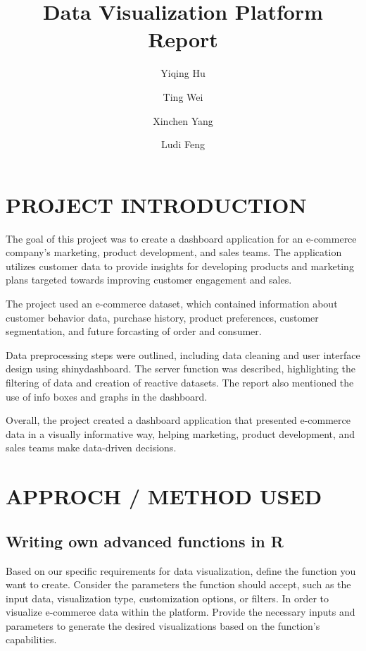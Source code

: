 \documentclass[
  11pt,
]{article}
\title{Data Visualization Platform Report}
\author[1]{Yiqing Hu}
\author[1]{Ting Wei}
\author[1]{Xinchen Yang}
\author[1]{Ludi Feng}
\affil[1]{University of Warsaw, Faculty of Economics Sciences}
\date{}
\begin{document}
\maketitle
\ifdefined\Shaded\renewenvironment{Shaded}{\begin{tcolorbox}[frame hidden, interior hidden, boxrule=0pt, sharp corners, borderline west={3pt}{0pt}{shadecolor}, breakable, enhanced]}{\end{tcolorbox}}\fi

\hypertarget{project-introduction}{%
\section{PROJECT INTRODUCTION}\label{project-introduction}}

The goal of this project was to create a dashboard application for an
e-commerce company's marketing, product development, and sales teams.
The application utilizes customer data to provide insights for
developing products and marketing plans targeted towards improving
customer engagement and sales.

The project used an e-commerce dataset, which contained information
about customer behavior data, purchase history, product preferences,
customer segmentation, and future forcasting of order and consumer.

Data preprocessing steps were outlined, including data cleaning and user
interface design using shinydashboard. The server function was
described, highlighting the filtering of data and creation of reactive
datasets. The report also mentioned the use of info boxes and graphs in
the dashboard.

Overall, the project created a dashboard application that presented
e-commerce data in a visually informative way, helping marketing,
product development, and sales teams make data-driven decisions.

\hypertarget{approch-method-used}{%
\section{APPROCH / METHOD USED}\label{approch-method-used}}

\hypertarget{writing-own-advanced-functions-in-r}{%
\subsection{Writing own advanced functions in
R}\label{writing-own-advanced-functions-in-r}}

Based on our specific requirements for data visualization, define the
function you want to create. Consider the parameters the function should
accept, such as the input data, visualization type, customization
options, or filters. In order to visualize e-commerce data within the
platform. Provide the necessary inputs and parameters to generate the
desired visualizations based on the function's capabilities.
\end{document}
